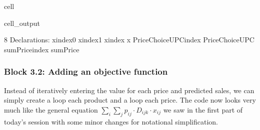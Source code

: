 \documentclass[letterpaper,10pt,english]{jupyterBook}
\begin{document}
\begin{sphinxuseclass}{cell}
\begin{sphinxVerbatimOutput}
\begin{sphinxuseclass}{cell_output}
\begin{sphinxVerbatim}[commandchars=\\\{\}]
8 Declarations: x\PYGZus{}index\PYGZus{}0 x\PYGZus{}index\PYGZus{}1 x\PYGZus{}index x PriceChoiceUPC\PYGZus{}index PriceChoiceUPC sumPrice\PYGZus{}index sumPrice
\end{sphinxVerbatim}

\end{sphinxuseclass}\end{sphinxVerbatimOutput}

\end{sphinxuseclass}

\subsubsection{Block 3.2: Adding an objective function}
\label{\detokenize{docs/Case1_5_Module2B_Retail_Price_Optimization_Script:block-3-2-adding-an-objective-function}}
\sphinxAtStartPar
Instead of iteratively entering the value for each price and predicted sales, we can simply create a loop  each product and a loop  each price. The code now looks very much like the general equation \(\sum_{i} \sum_{j} p_{ij} \cdot D_{ijk} \cdot x_{ij}\) we saw in the first part of today’s session with some minor changes for notational simplification.
\end{document}
